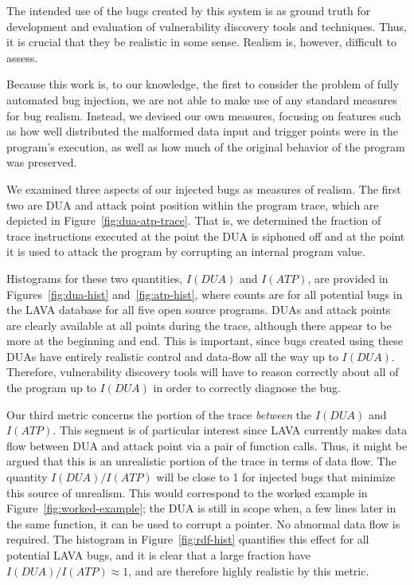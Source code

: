 The intended use of the bugs created by this system is as ground truth for development and evaluation of vulnerability discovery tools and techniques. 
Thus, it is crucial that they be realistic in some sense.  
Realism is, however, difficult to assess.

Because this work is, to our knowledge, the first to consider the problem of fully automated bug injection, we are not able to make use of any standard measures for bug realism.
Instead, we devised our own measures, focusing on features such as how well distributed the malformed data input and trigger points were in the program's execution, as well as how much of the original behavior of the program was preserved.

We examined three aspects of our injected bugs as measures of realism. 
The first two are DUA and attack point position within the program trace, which are depicted in Figure~\ref{fig:dua-atp-trace}.
That is, we determined the fraction of trace instructions executed at the point the DUA is siphoned off and at the point it is used to attack the program by corrupting an internal program value.

Histograms for these two quantities, $I(DUA)$ and $I(ATP)$, are provided in Figures~\ref{fig:dua-hist} and~\ref{fig:atp-hist}, where counts are for all potential bugs in the LAVA database for all five open source programs. 
DUAs and attack points are clearly available at all points during the trace, although there appear to be more at the beginning and end.
This is important, since bugs created using these DUAs have entirely realistic control and data-flow all the way up to $I(DUA)$.
Therefore, vulnerability discovery tools will have to reason correctly about all of the program up to $I(DUA)$ in order to correctly diagnose the bug.

Our third metric concerns the portion of the trace \emph{between} the $I(DUA)$ and $I(ATP)$.
This segment is of particular interest since LAVA currently makes data flow between DUA and attack point via a pair of function calls.
Thus, it might be argued that this is an unrealistic portion of the trace in terms of data flow.
The quantity $I(DUA)/I(ATP)$ will be close to 1 for injected bugs that minimize this source of unrealism.
This would correspond to the worked example in Figure~\ref{fig:worked-example}; the DUA is still in scope when, a few lines later in the same function, it can be used to corrupt a pointer.
No abnormal data flow is required.
The histogram in Figure~\ref{fig:rdf-hist} quantifies this effect for all potential LAVA bugs, and it is clear that a large fraction have $I(DUA)/I(ATP) \approx 1$, and are therefore highly realistic by this metric.

